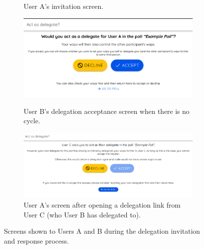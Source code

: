 \begin{figure}[H]
\begin{subfigure}[t]{0.28\linewidth}
    \caption{User A's invitation screen.}
    \label{fig:del-dialog}
  \end{subfigure}
  \hfill
  \begin{subfigure}[b]{0.68\linewidth}
    \centering
    \includegraphics[width=\linewidth]{../common/initial_vodle_screenshots/delaccept.png}
    \caption{User B's delegation acceptance screen when there is no cycle.}
    \label{fig:del-accept}
    
    \vspace{1em}
    
    \includegraphics[width=\linewidth]{../common/initial_vodle_screenshots/delaccept_cycle.png}
    \caption{User A's screen after opening a delegation link from User C (who User B has delegated to).}
    \label{fig:del-accept-cycle}
  \end{subfigure}
  \caption{Screens shown to Users A and B during the delegation invitation and response process.}
  \label{fig:delegation-accept-flow}
\end{figure}


